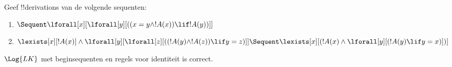 \documentclass[openany]{memoir}
\begin{document}
\begin{prob}
Geef !!{derivation}s van de volgende sequenten:
\begin{enumerate}
\item $\Sequent \lforall[x][\lforall[y][((x = y \land !A(x)) \lif !A(y))]]$
\item $\lexists[x][!A(x)] \land \lforall[y][\lforall[z][((!A(y) \land
    !A(z)) \lif y = z)]] \Sequent 
\lexists[x][(!A(x) \land \lforall[y][(!A(y) \lif y = x)])]$
\end{enumerate}
\end{prob}
\endgroup

\begingroup
\def\olfilename{OLP-0083}
\def\olfilepath{content/first-order-logic/sequent-calculus/}
\hypertarget{unit-OLP-0083}{}





\begin{prop}
$\Log{LK}$ met beginsequenten en regels voor identiteit is correct.
\end{prop}
\end{document}
